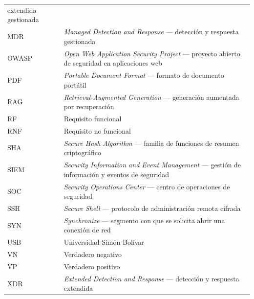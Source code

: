 \begin{longtable}{@{}p{}p{}@{}}
           extendida gestionada \\
MDR      & \textit{Managed Detection and Response} --- detección y respuesta gestionada \\
OWASP    & \textit{Open Web Application Security Project} --- proyecto abierto de
           seguridad en aplicaciones web \\
PDF      & \textit{Portable Document Format} --- formato de documento portátil \\
RAG      & \textit{Retrieval-Augmented Generation} --- generación aumentada por
           recuperación \\
RF       & Requisito funcional \\
RNF      & Requisito no funcional \\
SHA      & \textit{Secure Hash Algorithm} --- familia de funciones de resumen criptográfico \\
SIEM     & \textit{Security Information and Event Management} --- gestión de información
           y eventos de seguridad \\
SOC      & \textit{Security Operations Center} --- centro de operaciones de seguridad \\
SSH      & \textit{Secure Shell} --- protocolo de administración remota cifrada \\
SYN      & \textit{Synchronize} --- segmento con que se solicita abrir una conexión de red \\
USB      & Universidad Simón Bolívar \\
VN       & Verdadero negativo \\
VP       & Verdadero positivo \\
XDR      & \textit{Extended Detection and Response} --- detección y respuesta extendida \\
\end{longtable}
